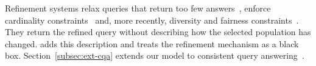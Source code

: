 Refinement systems relax queries that return too few answers~\cite{chu1994structured,muslea2005online,KoudasLTV06}, enforce cardinality constraints~\cite{MK09} and, more recently, diversity and fairness constraints~\cite{LMSJ23,ERICA,SSAD22,CSSM24,MLJ22}.
They return the refined query without describing how the selected population has changed.
\sys{} adds this description and treats the refinement mechanism as a black box.
Section~\ref{subsec:ext-cqa} extends our model to consistent query answering~\cite{arenas1999,bertossi2006,bertossi2011,chomicki2004}.